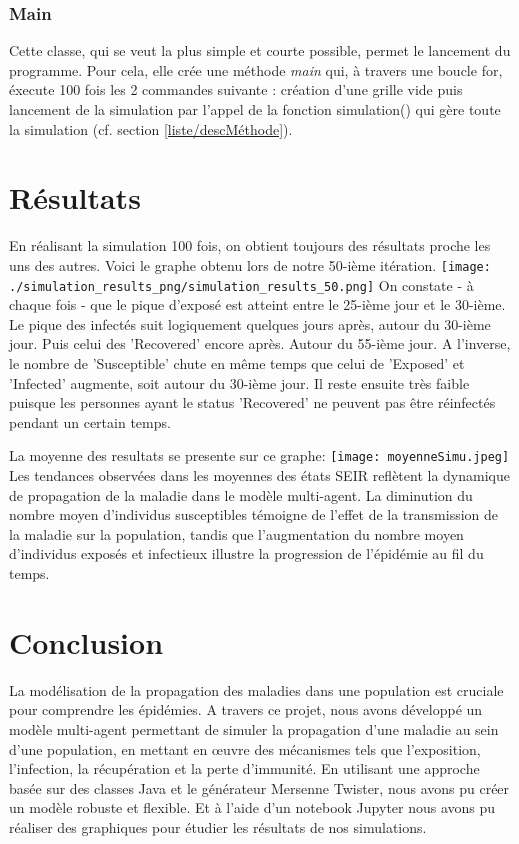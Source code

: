 \documentclass[french]{article}
\begin{document}


\subsubsection{Main}
Cette classe, qui se veut la plus simple et courte possible, permet le lancement du programme. Pour cela, elle crée une méthode \textit{main} qui, à travers une boucle for, éxecute 100 fois les 2 commandes suivante : création d'une grille vide puis lancement de la simulation par l'appel de la fonction simulation() qui gère toute la simulation (cf. section \ref{liste/descMéthode}).



\section{Résultats}
En réalisant la simulation 100 fois, on obtient toujours des résultats proche les uns des autres. Voici le graphe obtenu lors de notre 50-ième itération. \newline
\texttt{[image: ./simulation\_results\_png/simulation\_results\_50.png]} On constate - à chaque fois - que le pique d'exposé est atteint entre le 25-ième jour et le 30-ième. Le pique des infectés suit logiquement quelques jours après, autour du 30-ième jour. Puis celui des 'Recovered' encore après. Autour du 55-ième jour. A l'inverse, le nombre de 'Susceptible' chute en même temps que celui de 'Exposed' et 'Infected' augmente, soit autour du 30-ième jour. Il reste ensuite très faible puisque les personnes ayant le status 'Recovered' ne peuvent pas être réinfectés pendant un certain temps.

La moyenne des resultats se presente sur ce graphe:
\texttt{[image: moyenneSimu.jpeg]}
Les tendances observées dans les moyennes des états SEIR reflètent la dynamique de propagation de la maladie dans le modèle multi-agent. La diminution du nombre moyen d'individus susceptibles témoigne de l'effet de la transmission de la maladie sur la population, tandis que l'augmentation du nombre moyen d'individus exposés et infectieux illustre la progression de l'épidémie au fil du temps.

\section{Conclusion}
La modélisation de la propagation des maladies dans une population est cruciale pour comprendre les épidémies. A travers ce projet, nous avons développé un modèle multi-agent permettant de simuler la propagation d'une maladie au sein d'une population, en mettant en œuvre des mécanismes tels que l'exposition, l'infection, la récupération et la perte d'immunité. En utilisant une approche basée sur des classes Java et le générateur Mersenne Twister, nous avons pu créer un modèle robuste et flexible. Et à l'aide d'un notebook Jupyter nous avons pu réaliser des graphiques pour étudier les résultats de nos simulations.
\end{document}
